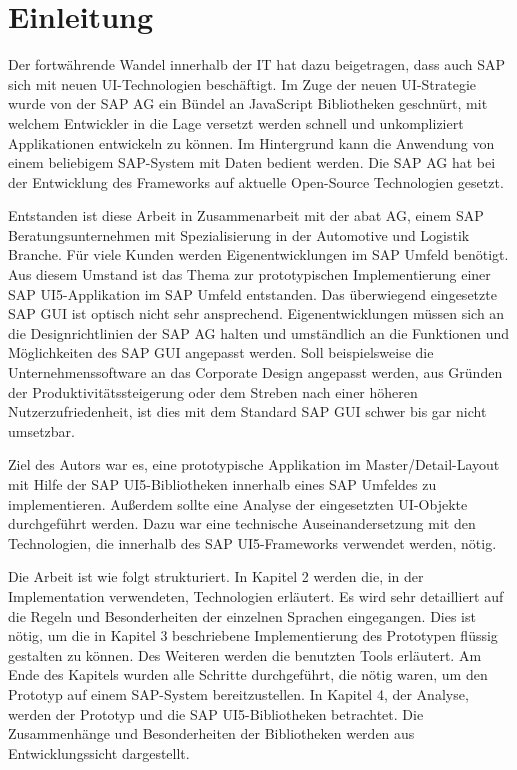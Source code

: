 \section{Einleitung}\label{einleitung}
Der fortwährende Wandel innerhalb der IT hat dazu beigetragen, dass auch SAP sich mit neuen UI-Technologien beschäftigt. Im Zuge der neuen UI-Strategie wurde von der SAP AG ein Bündel an JavaScript Bibliotheken geschnürt, mit welchem Entwickler in die Lage versetzt werden schnell und unkompliziert Applikationen entwickeln zu können. Im Hintergrund kann die Anwendung von einem beliebigem SAP-System mit Daten bedient werden. Die SAP AG hat bei der Entwicklung des Frameworks auf aktuelle Open-Source Technologien gesetzt.\par Entstanden ist diese Arbeit in Zusammenarbeit mit der abat AG, einem SAP Beratungsunternehmen mit Spezialisierung in der Automotive und Logistik Branche. Für viele Kunden werden Eigenentwicklungen im SAP Umfeld benötigt. Aus diesem Umstand ist das Thema zur prototypischen Implementierung einer SAP UI5-Applikation im SAP Umfeld entstanden. Das überwiegend eingesetzte SAP GUI ist optisch nicht sehr ansprechend. Eigenentwicklungen müssen sich an die Designrichtlinien der SAP AG halten und umständlich an die Funktionen und Möglichkeiten des SAP GUI angepasst werden. Soll beispielsweise die Unternehmenssoftware an das Corporate Design angepasst werden, aus Gründen der Produktivitätssteigerung oder dem Streben nach einer höheren Nutzerzufriedenheit, ist dies mit dem Standard SAP GUI schwer bis gar nicht umsetzbar.\par Ziel des Autors war es, eine prototypische Applikation im Master/Detail-Layout mit Hilfe der SAP UI5-Bibliotheken innerhalb eines SAP Umfeldes zu implementieren. Außerdem sollte eine Analyse der eingesetzten UI-Objekte durchgeführt werden. Dazu war eine technische Auseinandersetzung mit den Technologien, die innerhalb des SAP UI5-Frameworks verwendet werden, nötig.\par Die Arbeit ist wie folgt strukturiert. In Kapitel 2 werden die, in der Implementation verwendeten, Technologien erläutert. Es wird sehr detailliert auf die Regeln und Besonderheiten der einzelnen Sprachen eingegangen. Dies ist nötig, um die in Kapitel 3 beschriebene Implementierung des Prototypen flüssig gestalten zu können. Des Weiteren werden die benutzten Tools erläutert. Am Ende des Kapitels wurden alle Schritte durchgeführt, die nötig waren, um den Prototyp auf einem SAP-System bereitzustellen. In Kapitel 4, der Analyse, werden der Prototyp und die SAP UI5-Bibliotheken betrachtet. Die Zusammenhänge und Besonderheiten der Bibliotheken werden aus Entwicklungssicht dargestellt.